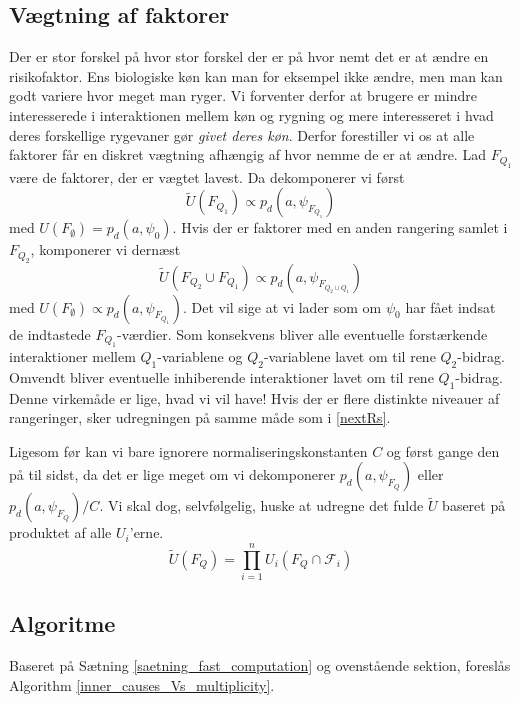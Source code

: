 \documentclass[a4paper, 12pt]{article}
\begin{document}
\subsection{Vægtning af faktorer}\label{rangering}
Der er stor forskel på hvor stor forskel der er på hvor nemt det er at ændre en risikofaktor. Ens biologiske køn kan man for eksempel ikke ændre, men man kan godt variere hvor meget man ryger. Vi forventer derfor at brugere er mindre interesserede i interaktionen mellem køn og rygning og mere interesseret i hvad deres forskellige rygevaner gør \emph{givet deres køn}. Derfor forestiller vi os at alle faktorer får en diskret vægtning afhængig af hvor nemme de er at ændre. Lad $F_{Q_1}$ være de faktorer, der er vægtet lavest. Da dekomponerer vi først
\begin{equation}
\tilde U(F_{Q_1})\propto p_d(a,\psi_{F_{Q_1}})
\end{equation}
med $ U({F_\emptyset})=p_d(a, \psi_0)$. Hvis der er faktorer med en anden rangering samlet i $F_{Q_2}$, komponerer vi dernæst 
\begin{equation}
\tilde U(F_{Q_2}\cup F_{Q_1})\propto p_d(a,\psi_{F_{Q_2\cup Q_1}})\label{nextRs}
\end{equation}
med $U (F_{\emptyset})\propto p_d(a, \psi_{F_{Q_1}})$. Det vil sige at vi lader som om $\psi_0$ har fået indsat de indtastede $F_{Q_1}$-værdier. Som konsekvens bliver alle eventuelle forstærkende interaktioner mellem $Q_1$-variablene og $Q_2$-variablene lavet om til rene $Q_2$-bidrag.  Omvendt bliver eventuelle inhiberende interaktioner lavet om til rene $Q_1$-bidrag. Denne virkemåde er lige, hvad vi vil have! Hvis der er flere distinkte niveauer af rangeringer, sker udregningen på samme måde som i \eqref{nextRs}. 

Ligesom før kan vi bare ignorere normaliseringskonstanten $C$ og først gange den på til sidst, da det er lige meget om vi dekomponerer $p_d(a, \psi_{F_Q})$ eller $p_d(a,\psi_{F_Q})/C$. Vi skal dog, selvfølgelig, huske at udregne det fulde $\tilde U$ baseret på produktet af alle $U_i$'erne.
\begin{equation}
\tilde U(F_Q)=\prod_{i=1}^nU_i(F_Q\cap \mathcal F_i)
\end{equation}

\subsection{Algoritme}
Baseret på Sætning \ref{saetning_fast_computation} og ovenstående sektion, foreslås Algorithm \ref{inner_causes_Vs_multiplicity}. 
\end{document}
